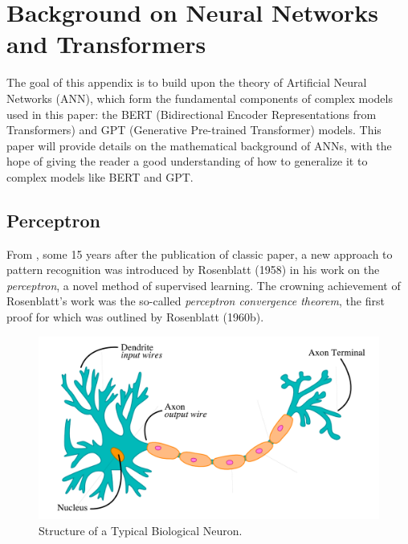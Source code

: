 \chapter[Background on ANN and Transformers]{Background on Neural Networks and Transformers}\label{app:neural_networks}
The goal of this appendix is to build upon the theory of Artificial Neural Networks (ANN), which form the fundamental components of complex models used in this paper: the BERT (Bidirectional Encoder Representations from Transformers) \cite{devlin2018bert} and GPT (Generative Pre-trained Transformer) \cite{radford2018improving} models. This paper will provide details on the mathematical background of ANNs, with the hope of giving the reader a good understanding of how to generalize it to complex models like BERT and GPT.

\section{Perceptron}
From , some 15 years after the publication of  classic paper, a new approach to pattern recognition was introduced by Rosenblatt (1958) in his work on the \textit{perceptron}, a novel method of supervised learning. The crowning achievement of Rosenblatt's work was the so-called \textit{perceptron convergence theorem}, the first proof for which was outlined by Rosenblatt (1960b).

\begin{figure}[!h]
\centering\includegraphics[scale = .4]{img/Neuron.pdf}
\caption[Structure of a Typical Biological Neuron]{Structure of a Typical Biological Neuron.\protect\footnotemark}
\label{fig:neuron}
\end{figure}



